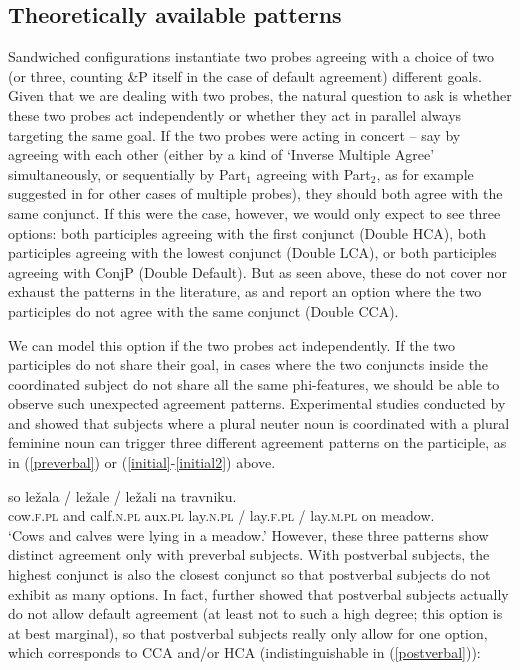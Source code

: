 \documentclass[output=paper
,modfonts
,nonflat]{langsci/langscibook}
\begin{document}
\subsection{Theoretically available patterns}

Sandwiched configurations instantiate two probes agreeing with a choice of two (or three, counting \&P itself in the case of default agreement) different goals. Given that we are dealing with two probes, the natural question to ask is whether these two probes act independently or whether they act in parallel always targeting the same goal. If the two probes were acting in concert -- say by agreeing with each other (either by a kind of `Inverse Multiple Agree' simultaneously, or sequentially by Part$_1$ agreeing with Part$_2$, as for example suggested in \citet{puskarmurphy:17} for other cases of multiple probes), they should both agree with the same conjunct. If this were the case, however, we would only expect to see three options: both participles agreeing with the first conjunct (Double HCA), both participles agreeing with the lowest conjunct (Double LCA), or both participles agreeing with ConjP (Double Default). But as seen above, these do not cover nor exhaust the patterns in the literature, as \cite{marusicnevinssaksida:07} and \cite{marusicnevinsbadecker:15} report an option where the two participles do not agree with the same conjunct (Double CCA).

We can model this option if the two probes act independently. If the two participles do not share their goal, in cases where the two conjuncts inside the coordinated subject do not share all the same phi-features, we should be able to observe such unexpected agreement patterns. Experimental studies conducted by \cite{marusicnevinsbadecker:15} and \cite{willergold:16} showed that subjects where a plural neuter noun is coordinated with a plural feminine noun can trigger three different agreement patterns on the participle, as in (\ref{preverbal}) or (\ref{initial}-\ref{initial2}) above.

\ea \label{preverbal}
 so ležala / ležale  / ležali na travniku.\\
{} cow.\textsc{f.pl} and calf.\textsc{n.pl} {} aux.\textsc{pl} lay.\textsc{n.pl} / lay.\textsc{f.pl} / lay.\textsc{m.pl} on meadow.\\
\glt `Cows and calves were lying in a meadow.'
\z
However, these three patterns show distinct agreement only with preverbal subjects. With postverbal subjects, the highest conjunct is also the closest conjunct so that postverbal subjects do not exhibit as many options. In fact, \cite{willergold:16} further showed that postverbal subjects actually do not allow default agreement (at least not to such a high degree; this option is at best marginal), so that postverbal subjects really only allow for one option, which corresponds to CCA and/or HCA (indistinguishable in (\ref{postverbal})):
\end{document}
